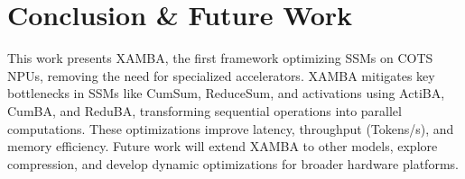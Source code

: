 \section{Conclusion \& Future Work}\label{conclusion}
This work presents XAMBA, the first framework optimizing SSMs on COTS NPUs, removing the need for specialized accelerators. XAMBA mitigates key bottlenecks in SSMs like CumSum, ReduceSum, and activations using ActiBA, CumBA, and ReduBA, transforming sequential operations into parallel computations. These optimizations improve latency, throughput (Tokens/s), and memory efficiency. Future work will extend XAMBA to other models, explore compression, and develop dynamic optimizations for broader hardware platforms.






